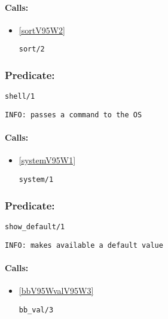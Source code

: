\paragraph{Calls:} 
\begin{itemize}
\item \ref{sortV95W2} 
\begin{verbatim}
sort/2
\end{verbatim}

\end{itemize}

\subsubsection{Predicate:} \label{shellV95W1}

\begin{verbatim}
shell/1
\end{verbatim}

{\small \begin{verbatim}
INFO: passes a command to the OS

\end{verbatim}}
\paragraph{Calls:} 
\begin{itemize}
\item \ref{systemV95W1} 
\begin{verbatim}
system/1
\end{verbatim}

\end{itemize}

\subsubsection{Predicate:} \label{showV95WdefaultV95W1}

\begin{verbatim}
show_default/1
\end{verbatim}

{\small \begin{verbatim}
INFO: makes available a default value

\end{verbatim}}
\paragraph{Calls:} 
\begin{itemize}
\item \ref{bbV95WvalV95W3} 
\begin{verbatim}
bb_val/3
\end{verbatim}

\end{itemize}
